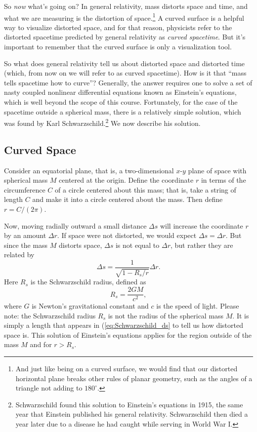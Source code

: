 So \textit{now} what's going on?  In general relativity, mass distorts
space and time, and what we are measuring is the distortion of
space.\footnote{And just like being on a curved surface, we would find
  that our distorted horizontal plane breaks other rules of planar
  geometry, such as the angles of a triangle not adding to
  $180^\circ$.}  A curved surface is a helpful way to visualize
distorted space, and for that reason, physicists refer to the
distorted spacetime predicted by general relativity as \textit{curved
  spacetime}.  But it's important to remember that the curved surface
is only a visualization tool.

So what does general relativity tell us about distorted space and
distorted time (which, from now on we will refer to as curved
spacetime).  How is it that ``mass tells spacetime how to curve''?
Generally, the answer requires one to solve a set of nasty coupled
nonlinear differential equations known as Einstein's equations, which
is well beyond the scope of this course.  Fortunately, for the case of
the spacetime outside a spherical mass, there is a relatively simple
solution, which was found by Karl
Schwarzschild.\footnote{Schwarzschild found this solution to
  Einstein's equations in 1915, the same year that Einstein published
  his general relativity.  Schwarzschild then died a year later due to a disease he had caught while serving in
  World War I.}  We now describe his solution.

\subsection{Curved Space}

Consider an equatorial plane, that is, a two-dimensional $x$-$y$ plane
of space with spherical mass $M$ centered at the origin.  Define the
coordinate $r$ in terms of the circumference $C$ of a circle centered
about this mass; that is, take a string of length $C$ and make it into
a circle centered about the mass. Then define $r=C/(2\pi)$.

Now, moving radially outward a small distance $\Delta s$ will increase
the coordinate $r$ by an amount $\Delta r$.  If space were not distorted,
we would expect $\Delta s = \Delta r$.  But since the mass $M$
distorts space, $\Delta s$ is not equal to $\Delta r$, but rather they
are related by
\begin{equation}
\label{eq:Schwarzschild_ds}
\Delta s = \frac{1}{\sqrt{1 - R_s/r}} \Delta r.
\end{equation}
Here $R_s$ is the Schwarzschild radius, defined as
\begin{equation}
\label{eq:Schwarzschild_radius}
R_s = \frac{2 G M}{c^2},
\end{equation}
where $G$ is Newton's gravitational constant and $c$ is the speed of
light. Please note: the Schwarzschild radius $R_s$ is not the radius
of the spherical mass $M$.  It is simply a length that appears in
(\ref{eq:Schwarzschild_ds} to tell us how distorted space is.  This
solution of Einstein's equations applies for the region outside of the
mass $M$ and for $r>R_s$.

